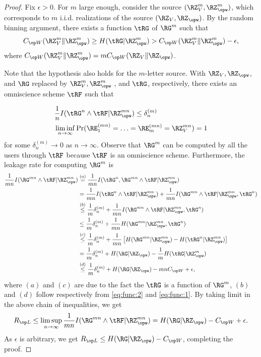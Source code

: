 {\begin{proof}
    Fix $\epsilon > 0$. For $m$ large enough, consider the source $(\RZ_V^m, \RZ_{\opw}^m)$, which corresponds to $m$ i.i.d. realizations of the source $(\RZ_V, \RZ_{\opw})$. By the random binning argument, there exists a function $\tRG$ of $\RG^m$ such that 
    \begin{align}\label{eq:func:1}
\wskc(\RZ_V^m\|\RZ_{\opw}^m) \geq H(\tRG|\RZ_{\opw}^m)> \wskc(\RZ_V^m\|\RZ_{\opw}^m) -\epsilon,
    \end{align}
    where $\wskc(\RZ_V^m\|\RZ_{\opw}^m)=m\wskc(\RZ_V\|\RZ_{\opw})$.

Note that the hypothesis also holds for the $m$-letter source. With $\RZ_V, \RZ_{\opw}$, and $\RG$ replaced by $\RZ_V^m, \RZ^m_{\opw}$ , and $\tRG$, respectively, there exists an omniscience scheme $\tRF$ such that

\begin{align}
 &\frac{1}{n}I(\tRG^n \wedge \tRF|\RZ_{\opw}^{mn}) \leq \delta_n^{(m)}\label{eq:func:2}\\
 &\liminf_{n \to \infty} \Pr(\RE_1^{(mn)} = \ldots =\RE_m^{(mn)} = \RZ_V^{mn}) = 1 
\end{align}
for some $\delta_n^{(m)} \to 0$ as $n \to \infty$.
Observe that  $\RG^m$ can be computed by all the users through $\tRF$ because $\tRF$ is an omniscience scheme. Furthermore, the leakage rate for computing $\RG^m$ is 
  \begin{align*}
        \frac{1}{mn} I(\RG^{mn}\wedge \tRF | \RZ^{mn}_{\opw}) & \stackrel{(a)}{=} \frac{1}{mn} I(\tRG^n, \RG^{mn}\wedge \tRF | \RZ^{mn}_{\opw})\\
        &= \frac{1}{mn} I(\tRG^n\wedge \tRF | \RZ^{mn}_{\opw}) + \frac{1}{mn} I(\RG^{mn}\wedge \tRF | \RZ^{mn}_{\opw}, \tRG^n)\\
        & \stackrel{(b)}{\leq}  \frac{1}{m}\delta_n^{(m)} + \frac{1}{mn} I(\RG^{mn}\wedge \tRF | \RZ^{mn}_{\opw}, \tRG^n)\\
        & \leq  \frac{1}{m}\delta_n^{(m)} + \frac{1}{mn} H(\RG^{mn} | \RZ^{mn}_{\opw}, \tRG^n)\\
        & \stackrel{(c)}{\leq}  \frac{1}{m}\delta_n^{(m)} + \frac{1}{mn} \left[ H(\RG^{mn} | \RZ^{mn}_{\opw}) -  H(\tRG^{n} | \RZ^{mn}_{\opw})\right]\\
        & =  \frac{1}{m}\delta_n^{(m)} +  H(\RG | \RZ_{\opw}) -  \frac{1}{m} H(\tRG | \RZ^{m}_{\opw})\\
        & \stackrel{(d)}{\leq} \frac{1}{m}\delta_n^{(m)} +  H(\RG | \RZ_{\opw}) -  mn \wskc +\epsilon,
    \end{align*}
where $(a)$ and $(c)$ are due to the fact the $\tRG$ is a function of $\RG^m$, $(b)$ and $(d)$ follow respectively from \eqref{eq:func:2} and \eqref{eq:func:1}. By taking limit in the above chain of inequalities, we get 
$$\rl \leq \limsup_{n \to \infty} \frac{1}{mn} I(\RG^{mn}\wedge \tRF | \RZ^{mn}_{\opw}) = H(\RG | \RZ_{\opw}) - \wskc +\epsilon.$$
As $\epsilon$ is arbitrary, we get $\rl \leq H(\RG | \RZ_{\opw}) - \wskc$, completing the proof.
\end{proof}



}
